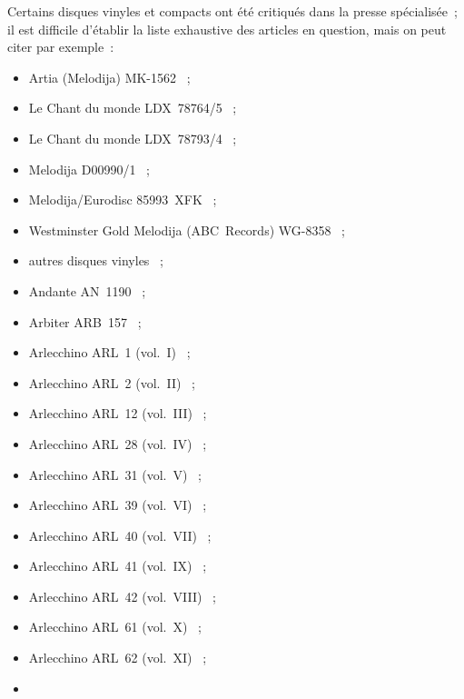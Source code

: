 Certains disques vinyles et compacts ont été critiqués dans la presse
spécialisée~; il est difficile d'établir la liste exhaustive des articles en
question, mais on peut citer par exemple~:
\begin{itemize}
 \item
 Artia (Melodija) MK-1562 \citep{Frankenstein}~;
 \item
 Le Chant du monde LDX~78764/5 \citep{Gaillard, Harrison, LaGrange85,
 Lompech85b, Ollivier, Simmons87, Vidal}~;
 \item
 Le Chant du monde LDX~78793/4 \citep{Fousnaquer86, Warrack}~;
 \item
 Melodija D00990/1 \citep{Holcman59a, Holcman59b}~;
 \item
 Melodija/Eurodisc 85993~XFK \citep{Alluard79, Thomas84}~;
 \item
 Westminster Gold Melodija (ABC~Records) WG-8358 \citep{Hall, Horowitz79,
 Kammerer, Rabinowitz79}~;
 \item
 autres disques vinyles \citep{Clark, Fleuret, Hoffele86, LaGrange72,
 Larson, Methuen, Myers80, Myers85, Myers89}~;
 \item
 Andante AN~1190 \citep{Cairns05, Morrison05, Mulbury05, Szersnovicz}~;
 \item
 Arbiter ARB~157 \citep{Cochard09, Cowan09, Harrington09a, Sanderson,
 Woolf09b}~;
 \item
 Arlecchino ARL~1 (vol.~I) \citep{Berigan, Cochard94a, Luguenot95a}~;
 \item
 Arlecchino ARL~2 (vol.~II) \citep{Berigan, Cochard94a, Luguenot95a}~;
 \item
 Arlecchino ARL~12 (vol.~III) \citep{Bosch, Cochard94b, Luguenot95a}~;
 \item
 Arlecchino ARL~28 (vol.~IV) \citep{Cochard95a, Luguenot95a}~;
 \item
 Arlecchino ARL~31 (vol.~V) \citep{Cochard95b, Luguenot95a}~;
 \item
 Arlecchino ARL~39 (vol.~VI) \citep{Cochard95a, Luguenot95a}~;
 \item
 Arlecchino ARL~40 (vol.~VII) \citep{Cochard95a, Luguenot95a}~;
 \item
 Arlecchino ARL~41 (vol.~IX) \citep{Luguenot95a}~;
 \item
 Arlecchino ARL~42 (vol.~VIII) \citep{Luguenot95a}~;
 \item
 Arlecchino ARL~61 (vol.~X) \citep{Luguenot95a}~;
 \item
 Arlecchino ARL~62 (vol.~XI) \citep{Luguenot95a}~;
 \item

\end{itemize}
